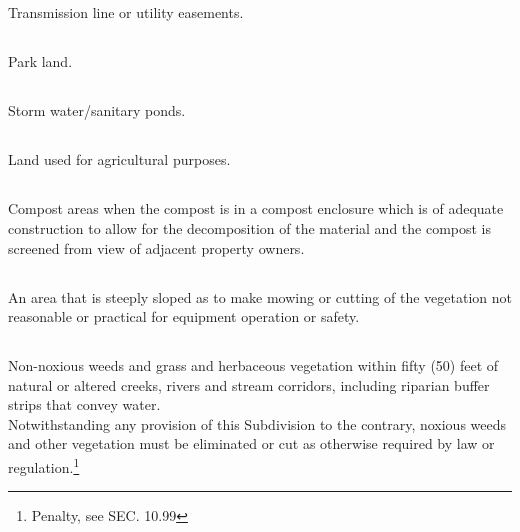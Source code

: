 \subsection{}
Transmission line or utility easements.
\subsection{}
Park land.
\subsection{}
Storm water/sanitary ponds.
\subsection{}
Land used for agricultural purposes.
\subsection{}
Compost areas when the compost is in a compost enclosure which is of adequate construction to allow for the decomposition of the material and the compost is screened from view of adjacent property owners.
\subsection{}
An area that is steeply sloped as to make mowing or cutting of the vegetation not reasonable or practical for equipment operation or safety.
\subsection{}
Non-noxious weeds and grass and herbaceous vegetation within fifty (50) feet of natural or altered creeks, rivers and stream corridors, including riparian buffer strips that convey water.\\
Notwithstanding any provision of this Subdivision to the contrary, noxious weeds and other vegetation must be eliminated or cut as otherwise required by law or regulation.\footnote{Penalty, see SEC. 10.99}\\


\setcounter{section}{59}
